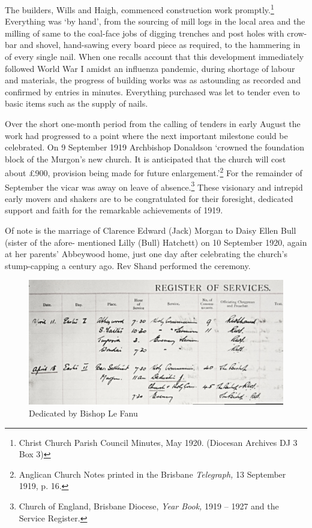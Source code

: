 The builders, Wills and Haigh, commenced construction work promptly.\footnote{Christ Church Parish Council Minutes, May 1920. (Diocesan Archives DJ 3 Box 3)} Everything was `by hand', from the sourcing of mill logs in the local area and the milling of same to the coal-face jobs of digging trenches and post holes with crow-bar and shovel, hand-sawing every board piece as required, to the hammering in of every single nail. When one recalls account that this development immediately followed World War I amidst an influenza pandemic, during shortage of labour and materials, the progress of building works was as astounding as recorded and confirmed by entries in minutes. Everything purchased was let to tender even to basic items such as the supply of nails.


Over the short one-month period from the calling of tenders in early August the work had progressed to a point where the next important milestone could be celebrated. On 9 September 1919 Archbishop Donaldson `crowned the foundation block of the Murgon's new church. It is anticipated that the church will cost about \pounds900, provision being made for future enlargement.'\footnote{Anglican Church Notes printed in the Brisbane \emph{Telegraph,} 13 September 1919, p. 16.} For the remainder of September the vicar was away on leave of absence.\footnote{Church of England, Brisbane Diocese, \emph{Year Book,} 1919 -- 1927 and the Service Register.} These visionary and intrepid early movers and shakers are to be congratulated for their foresight, dedicated support and faith for the remarkable achievements of 1919.


Of note is the marriage of Clarence Edward (Jack) Morgan to Daisy Ellen Bull (sister of the afore- mentioned Lilly (Bull) Hatchett) on 10 September 1920, again at her parents' Abbeywood home, just one day after celebrating the church's stump-capping a century ago. Rev Shand performed the ceremony.









\begin{figure}[!htb]
\begin{center}
\includegraphics[width=1.\textwidth,center]{../images/dedicationByBishopLeFanu.jpg}
\caption{Dedicated by Bishop Le Fanu}
\end{center}
\end{figure}





